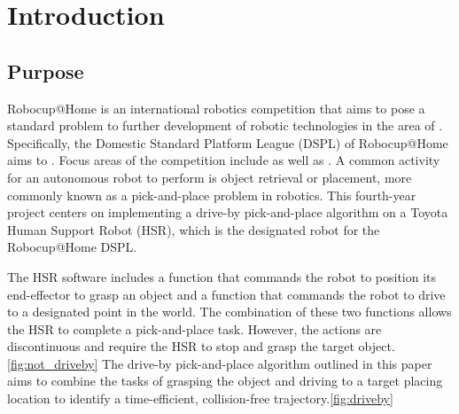 \documentclass[11pt]{article}
\begin{document}
\section{Introduction }
    \subsection{Purpose}
        Robocup@Home is an international robotics competition that aims to pose a standard problem to further development of robotic technologies in the area of \cite{noauthor_robocuphome_2020}. Specifically, the Domestic Standard Platform League (DSPL) of Robocup@Home aims to \cite{noauthor_robocuphome_2020}. Focus areas of the competition include  as well as \cite{noauthor_robocuphome_2020}. A common activity for an autonomous robot to perform is object retrieval or placement, more commonly known as a pick-and-place problem in robotics. This fourth-year project centers on implementing a drive-by pick-and-place algorithm on a Toyota Human Support Robot (HSR), which is the designated robot for the Robocup@Home DSPL. 

        The HSR software includes a function that commands the robot to position its end-effector to grasp an object and a function that commands the robot to drive to a designated point in the world. The combination of these two functions allows the HSR to complete a pick-and-place task. However, the actions are discontinuous and require the HSR to stop and grasp the target object.\cref{fig:not_driveby} The drive-by pick-and-place algorithm outlined in this paper aims to combine the tasks of grasping the object and driving to a target placing location to identify a time-efficient, collision-free trajectory.\cref{fig:driveby}
    
\end{document}
